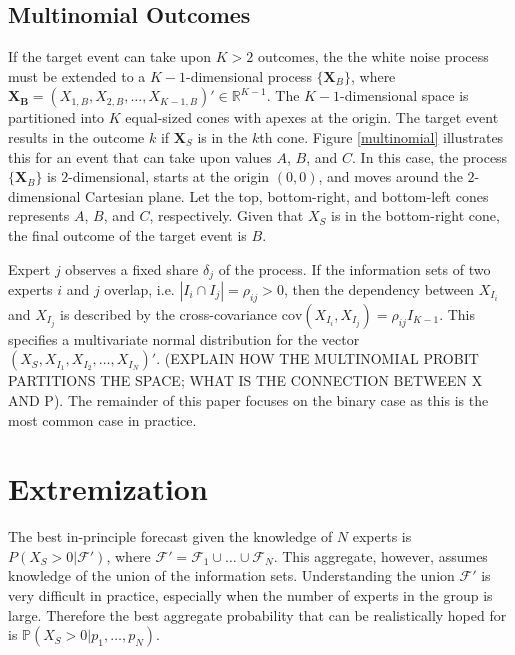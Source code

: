 \documentclass[11pt,twoside]{article}
\renewcommand{\P}{\mathbb{P}}
\begin{document}
\subsection{Multinomial Outcomes}
If the target event can take upon $K > 2$ outcomes, the the white noise process must be extended to a $K-1$-dimensional process $\{ \boldsymbol{X}_B \}$, where $\boldsymbol{X_B} = (X_{1,B}, X_{2,B},  \dots, X_{K-1,B})' \in \mathbb{R}^{K-1}$.  The $K-1$-dimensional space is partitioned into $K$ equal-sized cones with apexes at the origin. 
The target event results in the outcome $k$ if $\boldsymbol{X}_S$ is in the $k$th cone. Figure \ref{multinomial} illustrates this for an event that can take upon values $A$, $B$, and $C$. In this case, the process $\{ \boldsymbol{X}_B \}$ is $2$-dimensional, starts at the origin $(0,0)$, and moves around the $2$-dimensional Cartesian plane. Let the top, bottom-right, and bottom-left cones represents $A$, $B$, and $C$, respectively. Given that $X_S$ is in the bottom-right cone, the final outcome of the target event is $B$. 


Expert $j$ observes a fixed share $\delta_j$ of the process. If the information sets of two experts $i$ and $j$ overlap, i.e. $| I_i \cap I_j| = \rho_{ij} > 0$, then the dependency between $X_{I_i}$ and $X_{I_j}$ is described by the cross-covariance $\text{cov}(X_{I_i}, X_{I_j}) = \rho_{ij} I_{K-1}$. This specifies a multivariate normal distribution for the vector $(X_S, X_{I_1}, X_{I_2}, \dots, X_{I_N})'$. (EXPLAIN HOW THE MULTINOMIAL PROBIT PARTITIONS THE SPACE; WHAT IS THE CONNECTION BETWEEN X AND P). The remainder of this paper focuses on the binary case as this is the most common case in practice. 


\section{Extremization}
\label{extremization}

The best in-principle forecast given the knowledge of $N$ experts is $P(X_{S} > 0 |  \mathcal{F}')$, where $\mathcal{F}' = \mathcal{F}_1 \cup \dots \cup \mathcal{F}_N$. This aggregate, however, assumes knowledge of the union of the information sets. Understanding the union $\mathcal{F}'$ is very difficult in practice, especially when the number of experts in the group is large. Therefore the best aggregate probability that can be realistically hoped for is  $\P(X_{S} > 0 | p_1, \dots, p_N)$.
\end{document}

